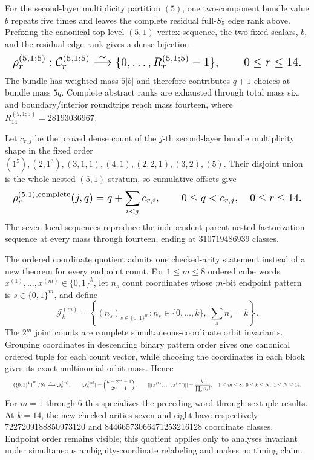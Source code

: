 \documentclass{article}
\newcommand{\fitmath}[1]{\resizebox{0.99\linewidth}{!}{$\displaystyle #1$}}
\begin{document}
For the second-layer multiplicity partition $(5)$, one two-component bundle
value $b$ repeats five times and leaves the complete residual full-$S_5$ edge
rank above. Prefixing the canonical top-level $(5,1)$ vertex sequence, the two
fixed scalars, $b$, and the residual edge rank gives a dense bijection
\begin{equation}
  \fitmath{%
    \rho_r^{(5,1;5)}:
      \mathcal C_r^{(5,1;5)}
      \overset{\sim}{\longrightarrow}
      \{0,\ldots,R_r^{(5,1;5)}-1\},
    \qquad 0\leq r\leq14.
  }
  \label{eq:optimization-crazy-sextuple-s6-s5-s5-bundle-ranking}
\end{equation}
The bundle has weighted mass $5|b|$ and therefore contributes $q+1$ choices at
bundle mass $5q$. Complete abstract ranks are exhausted through total mass six,
and boundary/interior roundtrips reach mass fourteen, where
$R_{14}^{(5,1;5)}=28193036967$.

Let $c_{r,j}$ be the proved dense count of the $j$-th second-layer bundle
multiplicity shape in the fixed order
$(1^5),(2,1^3),(3,1,1),(4,1),(2,2,1),(3,2),(5)$. Their disjoint union is the
whole nested $(5,1)$ stratum, so cumulative offsets give
\begin{equation}
  \fitmath{%
    \rho_r^{(5,1),\mathrm{complete}}(j,q)
      =q+\sum_{i<j}c_{r,i},
    \qquad 0\leq q<c_{r,j},\quad 0\leq r\leq14.
  }
  \label{eq:optimization-crazy-sextuple-s6-s5-complete-bundle-ranking}
\end{equation}
The seven local sequences reproduce the independent parent nested-factorization
sequence at every mass through fourteen, ending at $310719486939$ classes.

The ordered coordinate quotient admits one checked-arity statement instead of a
new theorem for every endpoint count. For $1\leq m\leq8$ ordered cube words
$x^{(1)},\ldots,x^{(m)}\in\{0,1\}^k$, let $n_s$ count coordinates whose
$m$-bit endpoint pattern is $s\in\{0,1\}^m$, and define
\[
  \mathcal{J}^{(m)}_k=\left\{(n_s)_{s\in\{0,1\}^m}:
    n_s\in\{0,\ldots,k\},\ \sum_s n_s=k\right\}.
\]
The $2^m$ joint counts are complete simultaneous-coordinate orbit invariants.
Grouping coordinates in descending binary pattern order gives one canonical
ordered tuple for each count vector, while choosing the coordinates in each
block gives its exact multinomial orbit mass. Hence
\begin{equation}
  \fitmath{%
    \left(\{0,1\}^k\right)^m/S_k
      \overset{\sim}{\longrightarrow}\mathcal{J}^{(m)}_k,
    \qquad
    |\mathcal{J}^{(m)}_k|=\binom{k+2^m-1}{2^m-1},
    \qquad
    |[(x^{(1)},\ldots,x^{(m)})]|=\frac{k!}{\prod_s n_s!},
    \quad 1\leq m\leq8,\ 0\leq k\leq N,\ 1\leq N\leq14.
  }
  \label{eq:optimization-crazy-preimage-cube-ordered-tuple-quotient}
\end{equation}
For $m=1$ through $6$ this specializes the preceding word-through-sextuple
results. At $k=14$, the new checked arities seven and eight have respectively
7227209188850973120 and 84466573066471253216128 coordinate classes. Endpoint
order remains visible; this quotient applies only to analyses invariant under
simultaneous ambiguity-coordinate relabeling and makes no timing claim.
\end{document}
